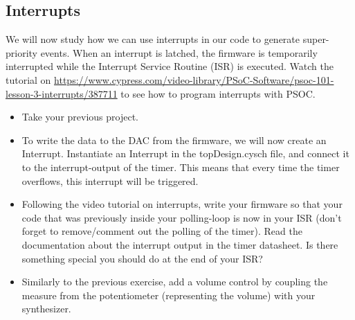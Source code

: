 \documentclass[11pt,a4paper]{article}
\theoremstyle{definition}%
\begin{document}
\subsection{Interrupts}

We will now study how we can use interrupts in our code to generate super-priority events. When an interrupt is latched, the firmware is temporarily interrupted while the Interrupt Service Routine (ISR) is executed. Watch the tutorial on \url{https://www.cypress.com/video-library/PSoC-Software/psoc-101-lesson-3-interrupts/387711} to see how to program interrupts with PSOC. 
\begin{itemize}
	\item Take your previous project. 
	\item To write the data to the DAC from the firmware, we will now create an Interrupt. Instantiate an Interrupt in the topDesign.cysch file, and connect it to the interrupt-output of the timer. This means that every time the timer overflows, this interrupt will be triggered. 
	\item Following the video tutorial on interrupts, write your firmware so that your code that was previously inside your polling-loop is now in your ISR (don't forget to remove/comment out the polling of the timer). Read the documentation about the interrupt output in the timer datasheet. Is there something special you should do at the end of your ISR? 
	\item Similarly to the previous exercise, add a volume control by coupling the measure from the potentiometer (representing the volume) with your synthesizer.
\end{itemize}
	
\end{document}
